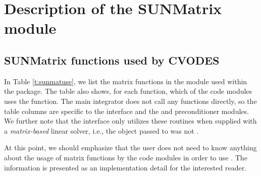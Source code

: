 \chapter{Description of the SUNMatrix module}\label{s:sunmatrix}



\section{SUNMatrix functions used by CVODES}
\label{s:sunmat_usage}

In Table \ref{t:sunmatuse}, we list the matrix functions in the 
{\sunmatrix} module used within the {\cvodes} package.
The table also shows, for each function, which of the code modules uses
the function. The main {\cvodes} integrator does not call any
{\sunmatrix} functions directly, so the table columns are specific to
the {\cvls} interface and the {\cvbandpre} and
{\cvbbdpre} preconditioner modules.  We further note that the {\cvls}
interface only utilizes these routines when supplied with a
\emph{matrix-based} linear solver, i.e., the {\sunmatrix} object
passed to  was not .

At this point, we should emphasize that the {\cvodes} user does not need to know 
anything about the usage of matrix functions by the {\cvodes} code modules in order 
to use {\cvodes}. The information is presented as an implementation detail for the 
interested reader.

